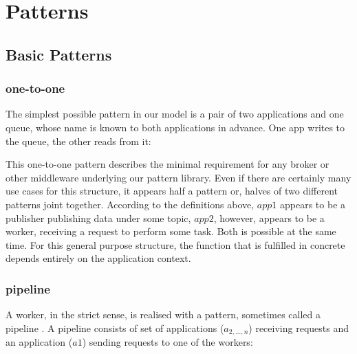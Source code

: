 \documentclass[a4paper]{scrartcl}
\newcommand{\menqOne}{\diamond}
\newcommand{\connect}[2]{
\draw [->,color=black] (#1) to (#2)
}
\begin{document}
\section{Patterns}\label{sec:patterns}
\subsection{Basic Patterns}
\subsubsection{one-to-one}\label{subsub:one}

The simplest possible pattern in our model
is a pair of two applications and one queue,
whose name is known to both applications
in advance. One app writes to the queue,
the other reads from it:


This one-to-one pattern
describes the minimal requirement
for any broker or other middleware
underlying our pattern library.
Even if there are certainly
many use cases for this structure,
it appears half a pattern or,
halves of two different patterns
joint together.
According to the definitions above,
$app 1$ appears to be a publisher
publishing data under some topic,
$app 2$, however, appears to be a worker,
receiving a request to perform some task.
Both is possible at the same time.
For this general purpose structure,
the function that is fulfilled in concrete
depends entirely on the application context.

\subsubsection{pipeline}\label{subsub:pipe}
A worker, in the strict sense,
is realised with a pattern,
sometimes called a pipeline \cite{cc13}.
A pipeline consists of set of applications
($a_{2, \dots, n}$) receiving requests
and an application ($a1$) sending requests
to one of the workers:

\end{document}
